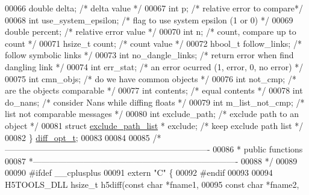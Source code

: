 \begin{DoxyCode}
00066     \textcolor{keywordtype}{double}   delta;                 \textcolor{comment}{/* delta value */}
00067     \textcolor{keywordtype}{int}      p;                     \textcolor{comment}{/* relative error to compare*/}
00068     \textcolor{keywordtype}{int}      use\_system\_epsilon;    \textcolor{comment}{/* flag to use system epsilon (1 or 0) */}
00069     \textcolor{keywordtype}{double}   percent;               \textcolor{comment}{/* relative error value */}
00070     \textcolor{keywordtype}{int}      n;                     \textcolor{comment}{/* count, compare up to count */}
00071     hsize\_t  count;                 \textcolor{comment}{/* count value */}
00072     hbool\_t  follow\_links;          \textcolor{comment}{/* follow symbolic links */}
00073     \textcolor{keywordtype}{int}      no\_dangle\_links;       \textcolor{comment}{/* return error when find dangling link */}
00074     \textcolor{keywordtype}{int}      err\_stat;              \textcolor{comment}{/* an error ocurred (1, error, 0, no error) */}
00075     \textcolor{keywordtype}{int}      cmn\_objs;              \textcolor{comment}{/* do we have common objects */}
00076     \textcolor{keywordtype}{int}      not\_cmp;               \textcolor{comment}{/* are the objects comparable */}
00077     \textcolor{keywordtype}{int}      contents;              \textcolor{comment}{/* equal contents */}
00078     \textcolor{keywordtype}{int}      do\_nans;               \textcolor{comment}{/* consider Nans while diffing floats */}
00079     \textcolor{keywordtype}{int}      m\_list\_not\_cmp;        \textcolor{comment}{/* list not comparable messages */}
00080     \textcolor{keywordtype}{int}      exclude\_path;          \textcolor{comment}{/* exclude path to an object */}
00081     \textcolor{keyword}{struct   }\hyperlink{structexclude__path__list}{exclude\_path\_list} * exclude; \textcolor{comment}{/* keep exclude path list */}
00082 \} \hyperlink{structdiff__opt__t}{diff\_opt\_t};
00083 
00084 
00085 \textcolor{comment}{/*-------------------------------------------------------------------------}
00086 \textcolor{comment}{ * public functions}
00087 \textcolor{comment}{ *-------------------------------------------------------------------------}
00088 \textcolor{comment}{ */}
00089 
00090 \textcolor{preprocessor}{#ifdef \_\_cplusplus}
00091 \textcolor{keyword}{extern} \textcolor{stringliteral}{"C"} \{
00092 \textcolor{preprocessor}{#endif}
00093 
00094 H5TOOLS\_DLL hsize\_t  h5diff(\textcolor{keyword}{const} \textcolor{keywordtype}{char} *fname1,
00095                 \textcolor{keyword}{const} \textcolor{keywordtype}{char} *fname2,

\end{DoxyCode}
